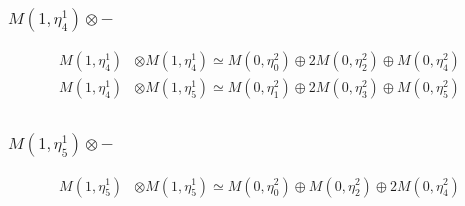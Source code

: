 \subsubsection{$ M(1,\eta^{1}_{4})\otimes -$}
\begin{align*}
M(1,\eta^{1}_{4}) &\otimes M(1,\eta^{1}_{4}) \simeq M(0,\eta^{2}_{0}) \oplus 2 M(0,\eta^{2}_{2}) \oplus M(0,\eta^{2}_{4}) \\
M(1,\eta^{1}_{4}) &\otimes M(1,\eta^{1}_{5}) \simeq M(0,\eta^{2}_{1}) \oplus 2 M(0,\eta^{2}_{3}) \oplus M(0,\eta^{2}_{5}) \\
\end{align*}

\subsubsection{$ M(1,\eta^{1}_{5})\otimes -$}
\begin{align*}
M(1,\eta^{1}_{5}) &\otimes M(1,\eta^{1}_{5}) \simeq M(0,\eta^{2}_{0}) \oplus M(0,\eta^{2}_{2}) \oplus 2 M(0,\eta^{2}_{4}) \\
\end{align*}

